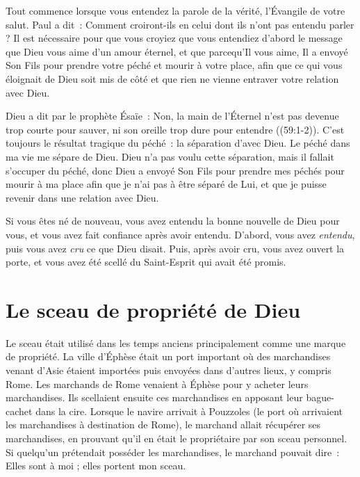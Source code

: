 \begin{specialpar}{}
Tout commence lorsque vous entendez \og la parole de la vérité,
 l'Évangile de votre salut. \fg{} Paul a dit~:
 \og Comment croiront-ils en celui dont ils n'ont pas entendu parler ? \fg{}
 Il est nécessaire pour que vous croyiez que vous entendiez d'abord le message
 que Dieu vous aime d'un amour éternel, et que parcequ'Il vous aime,
 Il a envoyé Son Fils pour prendre votre péché et mourir à votre place,
 afin que ce qui vous éloignait de Dieu soit mis de côté et que rien
 ne vienne entraver votre relation avec Dieu.
\end{specialpar}

Dieu a dit par le prophète Ésaïe~:
 \og Non, la main de l'Éternel n'est pas devenue trop courte pour sauver,
 ni son oreille trop dure pour entendre \fg{} ((59:1-2)).
 C'est toujours le résultat tragique du péché~: la séparation d'avec Dieu.
 Le péché dans ma vie me sépare de Dieu.
 Dieu n'a pas voulu cette séparation, mais il fallait s'occuper du péché,
 donc Dieu a envoyé Son Fils pour prendre mes péchés
 \ocadr pour mourir à ma place \ocadr afin que je n'ai pas
 à être séparé de Lui, et que je puisse revenir
 dans une relation avec Dieu.

Si vous êtes né de nouveau, vous avez entendu
 la bonne nouvelle de Dieu pour vous, et vous avez fait confiance
 après avoir entendu. D'abord, vous avez \emph{entendu},
 puis vous avez \emph{cru} ce que Dieu disait.
 Puis, après avoir cru, vous avez ouvert la porte,
 et vous avez été \og scellé du Saint-Esprit qui avait été promis. \fg{}


\section*{Le sceau de propriété de Dieu}

\begin{specialpar}{}
Le sceau était utilisé dans les temps anciens principalement
 comme une marque de propriété.
 La ville d'Éphèse était un port important où des marchandises
 venant d'Asie étaient importées puis envoyées dans d'autres lieux,
 y compris Rome.
 Les marchands de Rome venaient à Éphèse pour y acheter leurs marchandises.
 Ils scellaient ensuite ces marchandises en apposant leur bague-cachet
 dans la cire.
 Lorsque le navire arrivait à Pouzzoles
 (le port où arrivaient les marchandises à destination de Rome),
 le marchand allait récupérer ses marchandises,
 en prouvant qu'il en était le propriétaire par son sceau personnel.
 Si quelqu'un prétendait posséder les marchandises,
 le marchand pouvait dire~:
 \og Elles sont à moi ; elles portent mon sceau. \fg{}
\end{specialpar}

